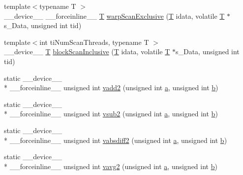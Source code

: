 \begin{DoxyCompactItemize}
\item 
{\footnotesize template$<$typename T $>$ }\\\-\_\-\-\_\-device\-\_\-\-\_\- \-\_\-\-\_\-forceinline\-\_\-\-\_\- \hyperlink{calib3d_8hpp_a3efb9551a871ddd0463079a808916717}{T} \hyperlink{namespacecv_1_1gpu_1_1device_a9a1d187cef0fe961935dbbe663162c14}{warp\-Scan\-Exclusive} (\hyperlink{calib3d_8hpp_a3efb9551a871ddd0463079a808916717}{T} idata, volatile \hyperlink{calib3d_8hpp_a3efb9551a871ddd0463079a808916717}{T} $\ast$s\-\_\-\-Data, unsigned int tid)
\item 
{\footnotesize template$<$int ti\-Num\-Scan\-Threads, typename T $>$ }\\\-\_\-\-\_\-device\-\_\-\-\_\- \hyperlink{calib3d_8hpp_a3efb9551a871ddd0463079a808916717}{T} \hyperlink{namespacecv_1_1gpu_1_1device_a5b0980a87cde3047e1f4554fc37d3f0a}{block\-Scan\-Inclusive} (\hyperlink{calib3d_8hpp_a3efb9551a871ddd0463079a808916717}{T} idata, volatile \hyperlink{calib3d_8hpp_a3efb9551a871ddd0463079a808916717}{T} $\ast$s\-\_\-\-Data, unsigned int tid)
\item 
static \-\_\-\-\_\-device\-\_\-\-\_\- \\*
\-\_\-\-\_\-forceinline\-\_\-\-\_\- unsigned int \hyperlink{namespacecv_1_1gpu_1_1device_a3d26bcd550a98c5f2f404c24f8c207dd}{vadd2} (unsigned int \hyperlink{legacy_8hpp_a1031d0e0a97a340abfe0a6ab9e831045}{a}, unsigned int \hyperlink{legacy_8hpp_ac04272e8ca865b8fba18d36edae9fd2a}{b})
\item 
static \-\_\-\-\_\-device\-\_\-\-\_\- \\*
\-\_\-\-\_\-forceinline\-\_\-\-\_\- unsigned int \hyperlink{namespacecv_1_1gpu_1_1device_a30d6a35a96ab8c8e136be50a16ae36a9}{vsub2} (unsigned int \hyperlink{legacy_8hpp_a1031d0e0a97a340abfe0a6ab9e831045}{a}, unsigned int \hyperlink{legacy_8hpp_ac04272e8ca865b8fba18d36edae9fd2a}{b})
\item 
static \-\_\-\-\_\-device\-\_\-\-\_\- \\*
\-\_\-\-\_\-forceinline\-\_\-\-\_\- unsigned int \hyperlink{namespacecv_1_1gpu_1_1device_aa4728e8d42337f57cd135611466d11b7}{vabsdiff2} (unsigned int \hyperlink{legacy_8hpp_a1031d0e0a97a340abfe0a6ab9e831045}{a}, unsigned int \hyperlink{legacy_8hpp_ac04272e8ca865b8fba18d36edae9fd2a}{b})
\item 
static \-\_\-\-\_\-device\-\_\-\-\_\- \\*
\-\_\-\-\_\-forceinline\-\_\-\-\_\- unsigned int \hyperlink{namespacecv_1_1gpu_1_1device_ad9f2a404d6b1fcae9d31b76a5cd3ae8a}{vavg2} (unsigned int \hyperlink{legacy_8hpp_a1031d0e0a97a340abfe0a6ab9e831045}{a}, unsigned int \hyperlink{legacy_8hpp_ac04272e8ca865b8fba18d36edae9fd2a}{b})

\end{DoxyCompactItemize}
